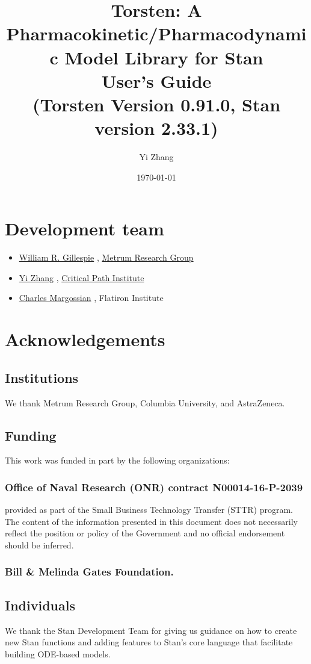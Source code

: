 \documentclass[12pt, reqno, oneside]{amsbook}
\author{Yi Zhang}
\date{\today}
\title{Torsten: A Pharmacokinetic/Pharmacodynamic Model Library for Stan\\\medskip
\large User's Guide \\  (Torsten Version 0.91.0, Stan version 2.33.1)}
\numberwithin{equation}{chapter}
\numberwithin{figure}{chapter}
\numberwithin{table}{chapter}
\theoremstyle{remark}
\begin{document}
\maketitle
\tableofcontents


\chapter*{Development team}
\label{sec:org5ae31e5}
\begin{itemize}
\item \href{mailto:billg@metrumrg.com}{William R. Gillespie} , \href{https://www.metrumrg.com/}{Metrum Research Group}
\item \href{mailto:yz@yizh.org}{Yi Zhang} , \href{https://www.c-path.org/}{Critical Path Institute}
\item \href{mailto:cmargossian@flatironinstitute.org}{Charles Margossian} , Flatiron Institute
\end{itemize}
\chapter*{Acknowledgements}
\label{sec:orgab46cef}
\section*{Institutions}
\label{sec:orgb690148}
We thank Metrum Research Group, Columbia University, and AstraZeneca.
\section*{Funding}
\label{sec:org1bad1f4}
This work was funded in part by the following organizations:
\subsection*{Office of Naval Research (ONR) contract N00014-16-P-2039}
\label{sec:org228195e}
provided as part of the Small Business Technology Transfer (STTR)
program. The content of the information presented in this document
does not necessarily reflect the position or policy of the
Government and no official endorsement should be inferred.
\subsection*{Bill \& Melinda Gates Foundation.}
\label{sec:orga901041}
\section*{Individuals}
\label{sec:org87098de}
We thank the Stan Development Team for giving us guidance on how to
create new Stan functions and adding features to Stan's core language
that facilitate building ODE-based models.
\end{document}
